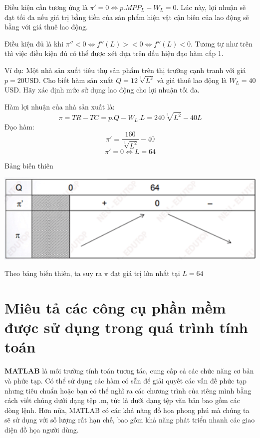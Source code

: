 \documentclass[12pt,a4paper]{report}
\begin{document}
    Điều kiện cần tương ứng là $\pi'=0 \Leftrightarrow p.MPP_L -W_L = 0$. Lúc này, lợi nhuận sẽ đạt tối đa nếu giá trị bằng tiền của sản phẩm hiện vật cận biên của lao động sẽ bằng với giá thuê lao động.
        
    Điều kiện đủ là khi $\pi''<0 \Leftrightarrow f ''(L) >< 0 \Leftrightarrow f''(L) < 0$. Tương tự như trên thì việc điều kiện đủ có thể được xét dựa trên dấu hiệu đạo hàm cấp 1.

    Ví dụ: Một nhà sản xuất tiêu thụ sản phẩm trên thị trường cạnh tranh với giá $p = 20$USD. Cho biết hàm sản xuất $Q = 12\sqrt[3]{L^2}$ và giá thuê lao động là $W_L = 40$USD. Hãy xác định mức sử dụng lao động cho lợi nhuận tối đa.

    Hàm lợi nhuận của nhà sản xuất là:
    \[
        \pi = TR - TC = p.Q - W_L.L = 240\sqrt[3]{L^2} - 40L
    \]
    Đạo hàm:
    \[
        \pi' = \frac{160}{\sqrt[3]{L^2}} - 40
    \]
    \[
        \pi' = 0 \Leftrightarrow L = 64    
    \]

    Bảng biến thiên
    \begin{center}
        \includegraphics[scale = 0.5]{fig4.png}
    \end{center}
    Theo bảng biến thiên, ta suy ra $\pi$ đạt giá trị lớn nhất tại $L = 64$
\section{Miêu tả các công cụ phần mềm được sử dụng trong quá trình tính toán}
\textbf{MATLAB} là môi trường tính toán tương tác, cung cấp cả các chức năng cơ bản và phức tạp. Có thể sử dụng các hàm có sẵn để giải quyết các vấn đề phức tạp nhưng tiêu chuẩn hoặc bạn có thể nghĩ ra các chương trình của riêng mình bằng cách viết chúng dưới dạng tệp .m, tức là dưới dạng tệp văn bản bao gồm các dòng lệnh. Hơn nữa, MATLAB có các khả năng đồ họa phong phú mà chúng ta sẽ sử dụng với số lượng rất hạn chế, bao gồm khả năng phát triển nhanh các giao diện đồ họa người dùng.
\end{document}
